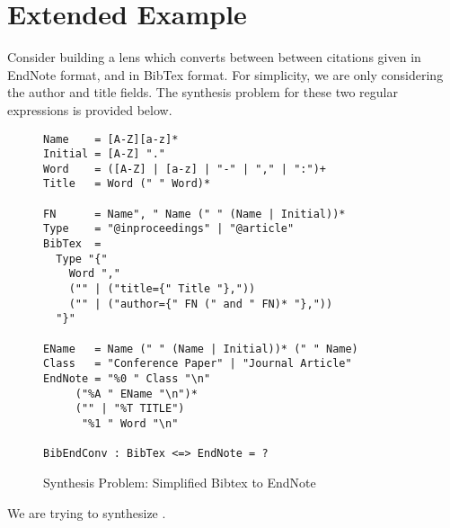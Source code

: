 \section{Extended Example}

Consider building a lens which converts between between citations given
in EndNote format, and in BibTex format.  For simplicity, we are only
considering the author and title fields.  The synthesis problem for these
two regular expressions is provided below.

\begin{figure}
\begin{lstlisting}
Name    = [A-Z][a-z]*
Initial = [A-Z] "."
Word    = ([A-Z] | [a-z] | "-" | "," | ":")+
Title   = Word (" " Word)*

FN      = Name", " Name (" " (Name | Initial))*
Type    = "@inproceedings" | "@article" 
BibTex  = 
  Type "{" 
    Word ","
    ("" | ("title={" Title "},"))
    ("" | ("author={" FN (" and " FN)* "},")) 
  "}"

EName   = Name (" " (Name | Initial))* (" " Name)
Class   = "Conference Paper" | "Journal Article"
EndNote = "%0 " Class "\n"
	 ("%A " EName "\n")*
	 ("" | "%T TITLE")
	  "%1 " Word "\n"

BibEndConv : BibTex <=> EndNote = ?
\end{lstlisting}
\caption{Synthesis Problem: Simplified Bibtex to EndNote}
\end{figure}

We are trying to synthesize \BibEndConv{}.
